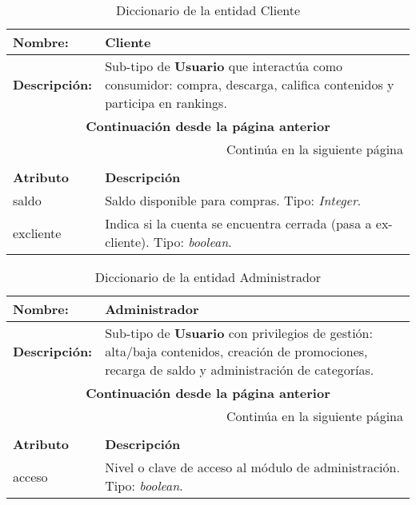 \renewcommand{\arraystretch}{1.3}
\begin{longtable}{|p{3.5cm}|p{10cm}|}
\caption{Diccionario de la entidad Cliente}
\label{tab:diccionarioCliente} \\ \hline
\textbf{Nombre:} & Cliente \\ \hline
\textbf{Descripción:} & 
Sub-tipo de \textbf{Usuario} que interactúa como consumidor: compra, descarga, califica contenidos y participa en rankings. \\ \hline
\endfirsthead
\multicolumn{2}{c}{\textbf{Continuación desde la página anterior}} \\ \hline
\endhead
\hline \multicolumn{2}{r}{{Continúa en la siguiente página}} \\ \hline
\endfoot
\hline
\endlastfoot
\multicolumn{2}{|p{13.5cm}|}{\textbf{ATRIBUTOS}} \\ \hline
\textbf{Atributo} & \textbf{Descripción} \\ \hline
saldo      & Saldo disponible para compras.  
Tipo: \textit{Integer}. \\ \hline
excliente  & Indica si la cuenta se encuentra cerrada (pasa a ex-cliente).  
Tipo: \textit{boolean}. \\ \hline
\end{longtable}

\renewcommand{\arraystretch}{1.3}
\begin{longtable}{|p{3.5cm}|p{10cm}|}
\caption{Diccionario de la entidad Administrador}
\label{tab:diccionarioAdministrador} \\ \hline
\textbf{Nombre:} & Administrador \\ \hline
\textbf{Descripción:} & 
Sub-tipo de \textbf{Usuario} con privilegios de gestión: alta/baja contenidos, creación de promociones, recarga de saldo y administración de categorías. \\ \hline
\endfirsthead
\multicolumn{2}{c}{\textbf{Continuación desde la página anterior}} \\ \hline
\endhead
\hline \multicolumn{2}{r}{{Continúa en la siguiente página}} \\ \hline
\endfoot
\hline
\endlastfoot
\multicolumn{2}{|p{13.5cm}|}{\textbf{ATRIBUTOS}} \\ \hline
\textbf{Atributo} & \textbf{Descripción} \\ \hline
acceso & Nivel o clave de acceso al módulo de administración.  
Tipo: \textit{boolean}. \\ \hline
\end{longtable}

